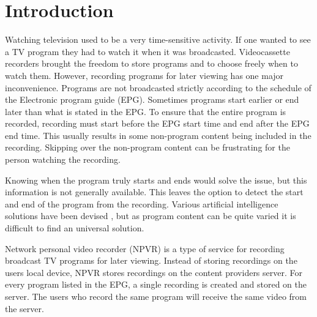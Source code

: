 \section{Introduction} \label{sec:intro}

Watching television used to be a very time-sensitive activity. If one wanted to see a TV program they had to watch it when it was broadcasted. Videocassette recorders %
brought the freedom to store programs and to choose freely when to watch them. However, recording programs for later viewing has one major inconvenience. Programs are not broadcasted strictly according to the schedule of the Electronic program guide (EPG). Sometimes programs start earlier or end later than what is stated in the EPG.
To ensure that the entire program is recorded, recording must start before the EPG start time and end after the EPG end time. %
This usually results in some non-program content being included in the recording. Skipping over the non-program content can be frustrating for the person watching the recording.

Knowing when the program truly starts and ends would solve the issue, but this information is not generally available. %
This leaves the option to detect the start and end of the program from the recording. Various artificial intelligence solutions have been devised \cite{berraniNonsupervisedApproachRepeated2008} \cite{ibrahimTVStreamStructuring2011} \cite{kompatsiarisTVContentAnalysis2012} \cite{mansonAutomaticTVBroadcast2010}, but as program content can be quite varied it is difficult to find an universal solution. 


Network personal video recorder (NPVR) is a type of service for recording broadcast TV programs for later viewing. Instead of storing recordings on the users local device, NPVR stores recordings on the content providers server. For every program listed in the EPG, a single recording is created and stored on the server. The users who record the same program will receive the same video from the server.

